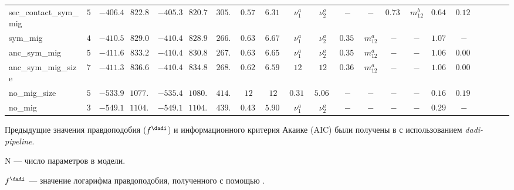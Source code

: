 \begin{landscape}
\begin{table}
{\begin{tabular}{lcccccccccccccccccccc}
sec\_contact\_sym\_mig & $5$ & $-406.4$ & $822.8$ & $\mathbf{-405.3}$ & $820.7$ & %
$305.2$ & $0.576$ & $6.313$ & $\nu_1^a$ & $\nu_2^a$ & $-$ & $-$ & $0.739$ & $m_{12}^b$ & $0.645$ & $0.122$ \\
sym\_mig & $4$ & $-410.5$ & $829.0$ & $\mathbf{-410.4}$ & $828.9$ & %
$266.2$ & $0.638$ & $6.672$ & $\nu_1^a$ & $\nu_2^a$ & $0.355$ & $m_{12}^a$ & $-$ & $-$ & $1.071$ & $-$ \\
anc\_sym\_mig & $5$ & $-411.6$ & $833.2$ & $\mathbf{-410.4}$ & $830.8$ & %
$267.0$ & $0.635$ & $6.659$ & $\nu_1^a$ & $\nu_2^a$ & $0.356$ & $m_{12}^a$ & $-$ & $-$ & $1.065$ & $0.000$ \\
anc\_sym\_mig\_size & $7$ & $-411.3$ & $836.6$ & $\mathbf{-410.4}$ & $834.8$ & %
$268.2$ & $0.621$ & $6.593$ & $12$ & $12$ & $0.365$ & $m_{12}^a$ & $-$ & $-$ & $1.061$ & $0.002$ \\
no\_mig\_size & $5$ & $\mathbf{-533.9}$ & $1077.8$ & $-535.4$ & $1080.8$ & %
$414.7$ & $12$ & $12$ & $0.313$ & $5.061$ & $-$ & $-$ & $-$ & $-$ & $0.164$ & $0.191$ \\
no\_mig & $3$ & $-549.1$ & $1104.2$ & $-549.1$ & $1104.2$ & %
$439.3$ & $0.432$ & $5.904$ & $\nu_1^a$ & $\nu_2^a$ & $-$ & $-$ & $-$ & $-$ & $0.292$ & $-$ \\
\hline
\end{tabular}%
}
\begin{tablenotes}
\item Предыдущие значения правдоподобия ($f^{\text{\dadi}}$) и информационного критерия Акаике (AIC) были получены в \cite{portik2017evaluating} с использованием \textit{dadi-pipeline}.
\item N --- число параметров в модели.
\item $f^\text{\dadi}$ --- значение логарифма правдоподобия, полученного с помощью \dadi.
\end{tablenotes}
\label{tab:app1:cro_cvln}
\end{table}

\end{landscape}


